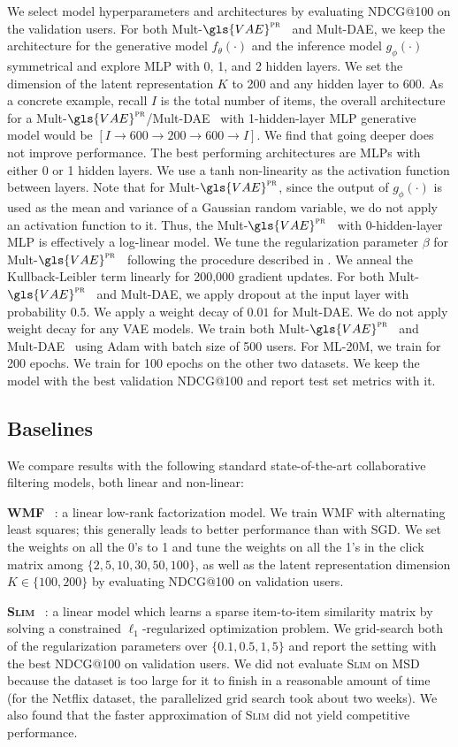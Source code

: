 \documentclass[sigconf]{acmart}
\DeclareRobustCommand{\parhead}[1]{\textbf{#1}~}
\newcommand{\mvae}{{\small Mult-}$\gls{VAE}^{\text{\sc pr}}$}
\newcommand{\mdae}{{\small Mult-}\gls{DAE}}
\begin{document}
We select model hyperparameters and architectures by evaluating NDCG@100 on the validation users. For both \mvae~ and \mdae, we keep the architecture for the generative model $f_\theta(\cdot)$ and the inference model $g_\phi(\cdot)$ symmetrical and explore \gls{MLP} with 0, 1, and 2 hidden layers. We set the dimension of the latent representation $K$ to 200 and any hidden layer to 600. As a concrete example, recall $I$ is the total number of items, the overall architecture for a \mvae/\mdae~ with 1-hidden-layer \gls{MLP} generative model would be $[I \rightarrow 600 \rightarrow 200 \rightarrow 600 \rightarrow I]$. We find that going deeper does not improve performance. 
The best performing architectures are \glspl{MLP} with either 0 or 1 hidden layers. 
We use a tanh non-linearity as the activation function between layers. Note that for \mvae, since the output of $g_\phi(\cdot)$ is used as the mean and variance of a Gaussian random variable, we do not apply an activation function to it. Thus, the \mvae~ with 0-hidden-layer \gls{MLP} is effectively a log-linear model.
We tune the regularization parameter $\beta$ for \mvae~ following the procedure described in . We anneal the Kullback-Leibler term linearly for 200,000 gradient updates. For both \mvae~ and \mdae, we apply dropout at the input layer with probability $0.5$. We apply a weight decay of $0.01$ for \mdae. We do not apply weight decay for any \gls{VAE} models.
We train both \mvae~ and \mdae~ using Adam \citep{kingma2014adam} with batch size of 500 users. For ML-20M, we train for 200 epochs. We train for 100 epochs on the other two datasets. We keep the model with the best validation NDCG@100 and report test set metrics with it. 


\subsection{Baselines}
We compare results with the following standard state-of-the-art collaborative filtering models, both linear and non-linear:

\parhead{\Gls{WMF}} \citep{hu2008collaborative}: a linear low-rank factorization model. We train \gls{WMF}
with alternating least squares; this generally leads to
better performance than with SGD. We set the weights on all the 0's to 1 and tune the weights on all the 1's in the click matrix among $\{2, 5, 10, 30, 50, 100\}$, as well as the latent representation dimension $K \in \{100, 200\}$ by evaluating NDCG@100 on validation users.

\parhead{\textsc{Slim}} \citep{ning2011slim}: a linear model which
learns a sparse item-to-item similarity matrix by solving
a constrained $\ell_1$-regularized optimization problem. We grid-search both of the regularization parameters over $\{0.1, 0.5, 1, 5\}$ and report the setting with the best NDCG@100 on validation users. We did not evaluate \textsc{Slim} on MSD because the dataset is too large for it to finish in a reasonable amount of time (for the Netflix dataset, the parallelized grid search took about two weeks). We also found that the faster approximation of \textsc{Slim} \citep{levy2013efficient} did not yield competitive performance. 
\end{document}
